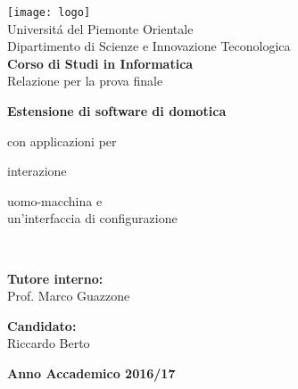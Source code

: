 \begin{titlepage}
\begin{center}
\texttt{[image: logo]}
\\[1\baselineskip]
\Large Universit\'a del Piemonte Orientale
\\[2\baselineskip]
\Large Dipartimento di Scienze e Innovazione Teconologica
\\[1\baselineskip]
\textbf{\Large Corso di Studi in Informatica}
\\[2\baselineskip]
\normalsize Relazione per la prova finale
\\[1\baselineskip]

{\LARGE \bfseries Estensione di software di domotica\par con applicazioni per\par interazione\par uomo-macchina e\\ un'interfaccia di configurazione}\\[1cm]
\vspace{1cm}
\begin{minipage}[t]{0.4\textwidth}
\flushleft
{\bf Tutore interno:}\\
Prof. Marco Guazzone\\
\end{minipage}
\begin{minipage}[t]{0.4\textwidth}
\flushright
{\bf Candidato:}\\
Riccardo Berto\\
\end{minipage}
\vfill
\vspace{1cm}
\textbf{\large Anno Accademico 2016/17}
\vfill
\end{center}
\end{titlepage}

